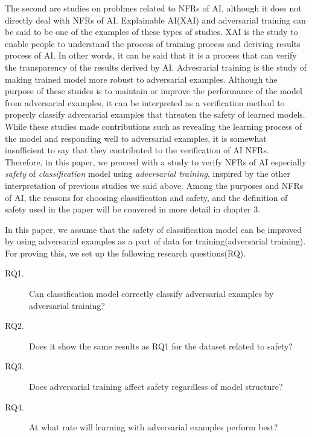 \documentclass[journal,article,submit,moreauthors,pdftex]{Definitions/mdpi}
\begin{document}
The second are studies on problmes related to NFRs of AI, although it does not directly deal with NFRs of AI.
Explainable AI(XAI) and adversarial training can be said to be one of the examples of these types of studies.
XAI is the study to enable people to understand the process of training process and deriving results process of AI.
In other words, it can be said that it is a process that can verify the transparency of the results derived by AI\cite{xai-arrieta,xai-samek,xai-transparency-murdoch,xai-transparency-ribeiro,ai-medical-xai-holzinger}.
Advesrarial training is the study of making trained model more robust to adversarial examples\cite{adversarial-goodfellow,adversarial-kurakin,adversarial-kurakin2,adversarial-papernot,adversarial-szegedy,adversarial-yuan}.
Although the purpose of these stuides is to maintain or improve the performance of the model from adversarial examples, it can be interpreted as a verification method to properly classify adversarial examples that threaten the safety of learned models.
While these studies made contributions such as revealing the learning process of the model and responding well to adversarial examples, it is somewhat insufficient to say that they contributed to the verification of AI NFRs.
Therefore, in this paper, we proceed with a study to verify NFRs of AI especially \textit{safety} of \textit{classification} model using \textit{adversarial training}, inspired by the other interpretation of previous studies we said above.
Among the purposes and NFRs of AI, the reasons for choosing classification and safety, and the definition of safety used in the paper will be convered in more detail in chapter 3.

In this paper, we assume that the safety of classification model can be improved by using adversarial examples as a part of data for training(adversarial training).
For proving this, we set up the following research questions(RQ).

\begin{description}
    \item[RQ1.]	Can classification model correctly classify adversarial examples by adversarial training?
    \item[RQ2.]	Does it show the same results as RQ1 for the dataset related to safety?
    \item[RQ3.] Does adversarial training affect safety regardless of model structure?
    \item[RQ4.]	At what rate will learning with adversarial examples perform best?
\end{description}
\end{document}
